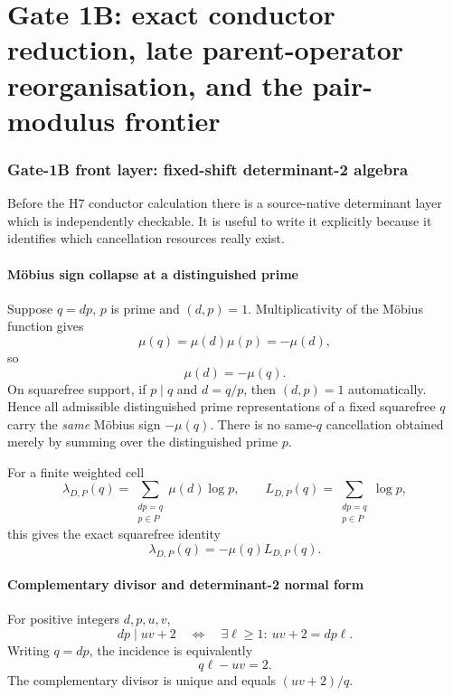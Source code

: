 \documentclass[11pt]{article}
\theoremstyle{definition}
\theoremstyle{remark}
\newcommand{\1}{\mathbf 1}
\begin{document}
\part{Gate 1B: exact conductor reduction, late parent-operator reorganisation, and the pair-modulus frontier}


\section{Gate-1B front layer: fixed-shift determinant-2 algebra}
\label{sec:g1b-det2-front}

Before the H7 conductor calculation there is a source-native determinant layer which is independently checkable.
It is useful to write it explicitly because it identifies which cancellation resources really exist.

\subsection{M\"obius sign collapse at a distinguished prime}

Suppose $q=dp$, $p$ is prime and $(d,p)=1$.  Multiplicativity of the M\"obius function gives
\[
 \mu(q)=\mu(d)\mu(p)=-\mu(d),
\]
so
\[
 \boxed{\mu(d)=-\mu(q).}
\tag{1B-F1}
\]
On squarefree support, if $p\mid q$ and $d=q/p$, then $(d,p)=1$ automatically.  Hence all admissible distinguished
prime representations of a fixed squarefree $q$ carry the \emph{same} M\"obius sign $-\mu(q)$.  There is no
same-$q$ cancellation obtained merely by summing over the distinguished prime $p$.

For a finite weighted cell
\[
 \lambda_{D,P}(q)=\sum_{\substack{dp=q\\p\in P}}\mu(d)\log p,
 \qquad
 L_{D,P}(q)=\sum_{\substack{dp=q\\p\in P}}\log p,
\]
this gives the exact squarefree identity
\[
 \boxed{\lambda_{D,P}(q)=-\mu(q)L_{D,P}(q).}
\tag{1B-F2}
\]

\subsection{Complementary divisor and determinant-2 normal form}

For positive integers $d,p,u,v$,
\[
 dp\mid uv+2
 \quad\Longleftrightarrow\quad
 \exists\ell\ge1:\ uv+2=dp\ell.
\tag{1B-F3}
\]
Writing $q=dp$, the incidence is equivalently
\[
 \boxed{q\ell-uv=2.}
\tag{1B-F4}
\]
The complementary divisor is unique and equals $(uv+2)/q$.
\end{document}
